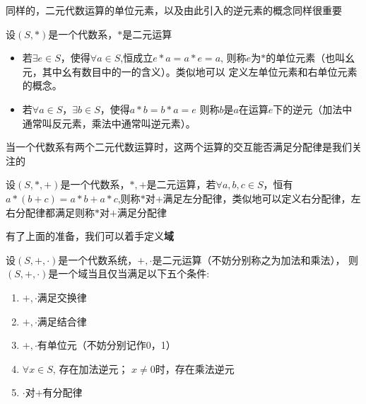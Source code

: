 同样的，二元代数运算的单位元素，以及由此引入的逆元素的概念同样很重要
\begin{definition}
    设$(S,*)$是一个代数系，$*$是二元运算
    \begin{itemize}
        \item 若$\exists e \in S$，使得$\forall a \in S$,恒成立$e*a=a*e=a$,
        则称$e$为$*$的单位元素（也叫幺元，其中幺有数目中的一的含义）。类似地可以
        定义左单位元素和右单位元素的概念。
        \item 若$\forall a \in S，\exists b \in S$，使得$a*b=b*a=e$
        则称$b$是$a$在运算$e$下的逆元（加法中通常叫反元素，乘法中通常叫逆元素）。
    \end{itemize}
\end{definition}

当一个代数系有两个二元代数运算时，这两个运算的交互能否满足分配律是我们关注的
\begin{definition}
    设$(S,*,+)$是一个代数系，$*,+$是二元运算，若$\forall a,b,c \in S$，恒有
    $a*(b+c)=a*b+a*c$,则称$*$对$+$满足左分配律，类似地可以定义右分配律，左右分配律都满足则称$*$对$+$满足分配律
\end{definition}

有了上面的准备，我们可以着手定义\textbf{域}
\begin{definition}
    设$(S,+,\cdot)$是一个代数系统，$+,\cdot$是二元运算（不妨分别称之为加法和乘法），
    则$(S,+,\cdot)$是一个域当且仅当满足以下五个条件:
    \begin{enumerate}
        \item $+,\cdot$满足交换律
        \item $+,\cdot$满足结合律
        \item $+,\cdot$有单位元（不妨分别记作0，1）
        \item $\forall x \in S$, 存在加法逆元；
                $x\neq 0$时，存在乘法逆元
        \item $\cdot$对$+$有分配律
    \end{enumerate}
\end{definition}

